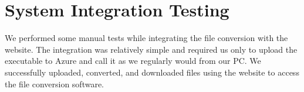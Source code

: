 
\section{System Integration Testing}
We performed some manual tests while integrating the file conversion with the website. The integration was relatively simple and required us only to upload the executable to Azure and call it as we regularly would from our PC.
We successfully uploaded, converted, and downloaded files using the website to access the file conversion software.